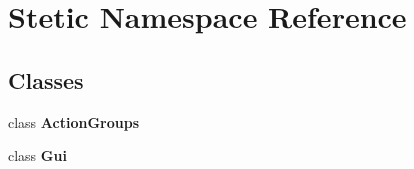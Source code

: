 \hypertarget{namespace_stetic}{}\section{Stetic Namespace Reference}
\label{namespace_stetic}
\subsection*{Classes}
\begin{DoxyCompactItemize}
\item 
class {\bfseries Action\+Groups}
\item 
class {\bfseries Gui}
\end{DoxyCompactItemize}
